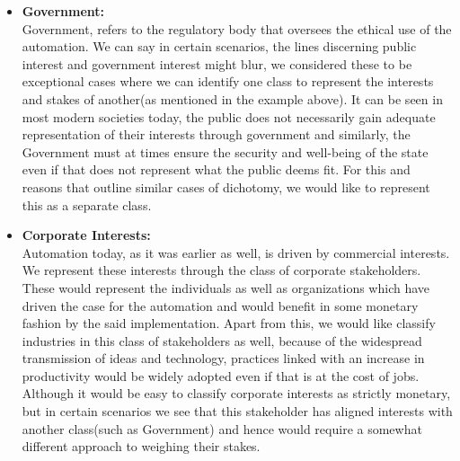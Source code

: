 \begin{enumerate}[a]
\begin{itemize}
      \item \textbf{Government:}\\
        Government, refers to the regulatory body that oversees the ethical use of the automation. We can say in certain scenarios, the lines discerning public interest and government interest might blur, we considered these to be exceptional cases where we can identify one class to represent the interests and stakes of another(as mentioned in the example above). It can be seen in most modern societies today, the public does not necessarily gain adequate representation of their interests through government and similarly, the Government must at times ensure the security and well-being of the state even if that does not represent what the public deems fit. For this and reasons that outline similar cases of dichotomy, we would like to represent this as a separate class.
      \item \textbf{Corporate Interests:}\\
        Automation today, as it was earlier as well, is driven by commercial interests. We represent these interests through the class of corporate stakeholders. These would represent the individuals as well as organizations which have driven the case for the automation and would benefit in some monetary fashion by the said implementation. Apart from this, we would like classify industries in this class of stakeholders as well, because of the widespread transmission of ideas and technology, practices linked with an increase in productivity would be widely adopted even if that is at the cost of jobs. Although it would be easy to classify corporate interests as strictly monetary, but in certain scenarios we see that this stakeholder has aligned interests with another class(such as Government) and hence would require a somewhat different approach to weighing their stakes.\\ 
    \end{itemize}
\end{enumerate}


